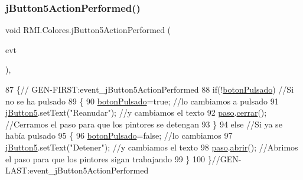 \subsubsection{\texorpdfstring{j\+Button5\+Action\+Performed()}{jButton5ActionPerformed()}}
{\footnotesize\ttfamily void R\+M\+I.\+Colores.\+j\+Button5\+Action\+Performed (\begin{DoxyParamCaption}\item[{java.\+awt.\+event.\+Action\+Event}]{evt }\end{DoxyParamCaption})\hspace{0.3cm}{\ttfamily [inline]}, {\ttfamily [private]}}


\begin{DoxyCode}
87                                                                          \{\textcolor{comment}{//
      GEN-FIRST:event\_jButton5ActionPerformed}
88         \textcolor{keywordflow}{if}(!\mbox{\hyperlink{class_r_m_i_1_1_colores_af81a5077f5960e712338fe4962eadfe2}{botonPulsado}}) \textcolor{comment}{//Si no se ha pulsado}
89         \{                 
90             \mbox{\hyperlink{class_r_m_i_1_1_colores_af81a5077f5960e712338fe4962eadfe2}{botonPulsado}}=\textcolor{keyword}{true};             \textcolor{comment}{//lo cambiamos a pulsado}
91             \mbox{\hyperlink{class_r_m_i_1_1_colores_a20b401d6acdf13f51e984d95c4697d90}{jButton5}}.setText(\textcolor{stringliteral}{"Reanudar"});  \textcolor{comment}{//y cambiamos el texto}
92             \mbox{\hyperlink{class_r_m_i_1_1_colores_aad069517f2f10a0e1a58d42eac79bb76}{paso}}.\mbox{\hyperlink{class_r_m_i_1_1_paso_a94a5334985d909a4db0b5efda2f68a9f}{cerrar}}();    \textcolor{comment}{//Cerramos el paso para que los pintores se detengan}
93         \}
94         \textcolor{keywordflow}{else} \textcolor{comment}{//Si ya se había pulsado}
95         \{                           
96             \mbox{\hyperlink{class_r_m_i_1_1_colores_af81a5077f5960e712338fe4962eadfe2}{botonPulsado}}=\textcolor{keyword}{false};            \textcolor{comment}{//lo cambiamos}
97             \mbox{\hyperlink{class_r_m_i_1_1_colores_a20b401d6acdf13f51e984d95c4697d90}{jButton5}}.setText(\textcolor{stringliteral}{"Detener"});  \textcolor{comment}{//y cambiamos el texto}
98             \mbox{\hyperlink{class_r_m_i_1_1_colores_aad069517f2f10a0e1a58d42eac79bb76}{paso}}.\mbox{\hyperlink{class_r_m_i_1_1_paso_a812e38e5e102e7da3fbd1ba669baa213}{abrir}}();    \textcolor{comment}{//Abrimos el paso para que los pintores sigan trabajando}
99         \}
100     \}\textcolor{comment}{//GEN-LAST:event\_jButton5ActionPerformed}
\end{DoxyCode}
\mbox{\label{class_r_m_i_1_1_colores_aea22d7de357030bdee160e3a46a9720e}} 
